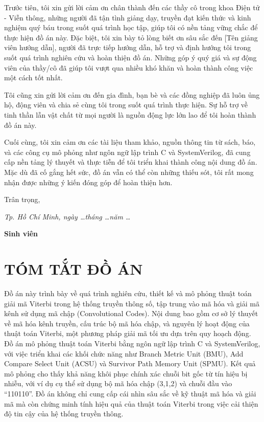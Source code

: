 Trước tiên, tôi xin gửi lời cảm ơn chân thành đến các thầy cô trong khoa Điện tử - Viễn thông, những người đã tận tình giảng dạy, truyền đạt kiến thức và kinh nghiệm quý báu trong suốt quá trình học tập, giúp tôi có nền tảng vững chắc để thực hiện đồ án này. Đặc biệt, tôi xin bày tỏ lòng biết ơn sâu sắc đến [Tên giảng viên hướng dẫn], người đã trực tiếp hướng dẫn, hỗ trợ và định hướng tôi trong suốt quá trình nghiên cứu và hoàn thiện đồ án. Những góp ý quý giá và sự động viên của thầy/cô đã giúp tôi vượt qua nhiều khó khăn và hoàn thành công việc một cách tốt nhất.

Tôi cũng xin gửi lời cảm ơn đến gia đình, bạn bè và các đồng nghiệp đã luôn ủng hộ, động viên và chia sẻ cùng tôi trong suốt quá trình thực hiện. Sự hỗ trợ về tinh thần lẫn vật chất từ mọi người là nguồn động lực lớn lao để tôi hoàn thành đồ án này.

Cuối cùng, tôi xin cảm ơn các tài liệu tham khảo, nguồn thông tin từ sách, báo, và các công cụ mô phỏng như ngôn ngữ lập trình C và SystemVerilog, đã cung cấp nền tảng lý thuyết và thực tiễn để tôi triển khai thành công nội dung đồ án. Mặc dù đã cố gắng hết sức, đồ án vẫn có thể còn những thiếu sót, tôi rất mong nhận được những ý kiến đóng góp để hoàn thiện hơn.

Trân trọng,

\vspace{6cm}
\hspace{6cm} \textit{Tp. Hồ Chí Minh, ngày \dots tháng \dots năm \dots }

\hspace{10cm} \textbf{Sinh viên}

\newpage
{}
\section*{\centering TÓM TẮT ĐỒ ÁN}

Đồ án này trình bày về quá trình nghiên cứu, thiết kế và mô phỏng thuật toán giải mã Viterbi trong hệ thống truyền thông số, tập trung vào mã hóa và giải mã kênh sử dụng mã chập (Convolutional Codes). Nội dung bao gồm cơ sở lý thuyết về mã hóa kênh truyền, cấu trúc bộ mã hóa chập, và nguyên lý hoạt động của thuật toán Viterbi, một phương pháp giải mã tối ưu dựa trên quy hoạch động. Đồ án mô phỏng thuật toán Viterbi bằng ngôn ngữ lập trình C và SystemVerilog, với việc triển khai các khối chức năng như Branch Metric Unit (BMU), Add Compare Select Unit (ACSU) và Survivor Path Memory Unit (SPMU). Kết quả mô phỏng cho thấy khả năng khôi phục chính xác chuỗi bit gốc từ tín hiệu bị nhiễu, với ví dụ cụ thể sử dụng bộ mã hóa chập (3,1,2) và chuỗi đầu vào “110110”. Đồ án không chỉ cung cấp cái nhìn sâu sắc về kỹ thuật mã hóa và giải mã mà còn chứng minh tính hiệu quả của thuật toán Viterbi trong việc cải thiện độ tin cậy của hệ thống truyền thông.

\newpage
\tableofcontents
\listoffigures
\listoftables